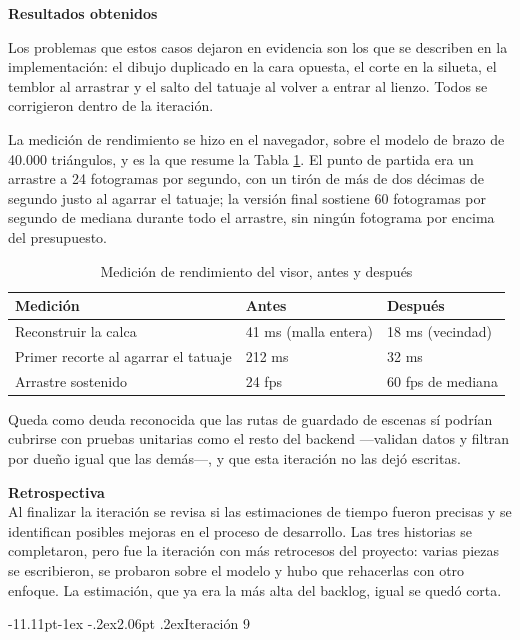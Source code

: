 \documentclass[12pt,letterpaper,oneside]{report}
\makeatletter
\renewcommand\subsection{\@startsection{subsection}{2}{\z@}%
  {-11.11pt\@plus -1ex \@minus -.2ex}{2.06pt \@plus .2ex}{\normalfont\normalsize\bfseries}}
\newcommand{\titulopar}[1]{\par\textbf{#1}\par}
\newcommand{\tituloparpegado}[1]{\par\textbf{#1}\\\indent\ignorespaces}
\makeatother
\begin{document}
\titulopar{Resultados obtenidos}
Los problemas que estos casos dejaron en evidencia son los que se describen en la implementación: el dibujo duplicado en la cara opuesta, el corte en la silueta, el temblor al arrastrar y el salto del tatuaje al volver a entrar al lienzo. Todos se corrigieron dentro de la iteración.

La medición de rendimiento se hizo en el navegador, sobre el modelo de brazo de 40.000 triángulos, y es la que resume la Tabla \ref{tab:rendimiento8}. El punto de partida era un arrastre a 24 fotogramas por segundo, con un tirón de más de dos décimas de segundo justo al agarrar el tatuaje; la versión final sostiene 60 fotogramas por segundo de mediana durante todo el arrastre, sin ningún fotograma por encima del presupuesto.

\begin{table}[H]
  \centering
  \caption{Medición de rendimiento del visor, antes y después}
  \label{tab:rendimiento8}
  \renewcommand{\arraystretch}{1.2}
  \begin{tabular}{|p{6.2cm}|p{3.6cm}|p{3.6cm}|}
    \hline
    \textbf{Medición} & \textbf{Antes} & \textbf{Después} \\
    \hline
    Reconstruir la calca & 41 ms (malla entera) & 18 ms (vecindad) \\ \hline
    Primer recorte al agarrar el tatuaje & 212 ms & 32 ms \\ \hline
    Arrastre sostenido & 24 fps & 60 fps de mediana \\ \hline
  \end{tabular}
\end{table}

Queda como deuda reconocida que las rutas de guardado de escenas sí podrían cubrirse con pruebas unitarias como el resto del backend —validan datos y filtran por dueño igual que las demás—, y que esta iteración no las dejó escritas.

\vspace{\parskip}
\tituloparpegado{Retrospectiva}
Al finalizar la iteración se revisa si las estimaciones de tiempo fueron precisas y se identifican posibles mejoras en el proceso de desarrollo. Las tres historias se completaron, pero fue la iteración con más retrocesos del proyecto: varias piezas se escribieron, se probaron sobre el modelo y hubo que rehacerlas con otro enfoque. La estimación, que ya era la más alta del backlog, igual se quedó corta.


\subsection{Iteración 9}
\end{document}
